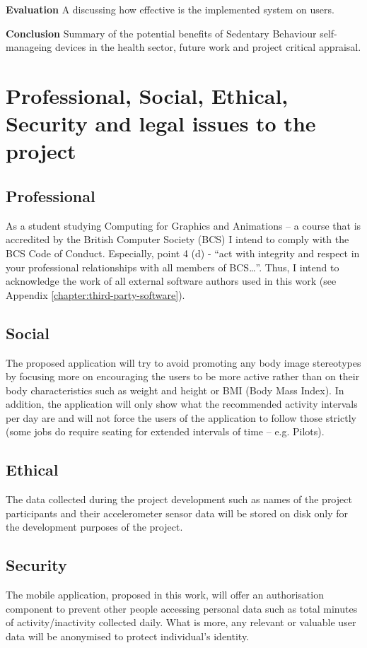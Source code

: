     
    \textbf{Evaluation} A discussing how effective is the implemented system on users.\newline
    
    
    \textbf{Conclusion} Summary of the potential benefits of Sedentary Behaviour self-manageing devices in the health sector, future work and project critical appraisal.\newline
    
    
    \section{Professional, Social, Ethical, Security and legal issues to the project}
    
    \subsection{Professional}
    As a student studying Computing for Graphics and Animations – a course that is accredited by the British Computer Society (BCS) I intend to comply with the BCS Code of Conduct. Especially, point 4 (d) \citep{bcs_2017} - “act with integrity and respect in your professional relationships with all members of BCS…”. Thus, I intend to acknowledge the work of all external software authors used in this work (see Appendix \ref{chapter:third-party-software}).

    \subsection{Social}
    The proposed application will try to avoid promoting any body image stereotypes by focusing more on encouraging the users to be more active rather than on their body characteristics such as weight and height or BMI (Body Mass Index). In addition, the application will only show what the recommended activity intervals per day are and will not force the users of the application to follow those strictly (some jobs do require seating for extended intervals of time – e.g. Pilots).
    
    \subsection{Ethical}
    The data collected during the project development such as names of the project participants and their accelerometer sensor data will be stored on disk only for the development purposes of the project. 
    
    \subsection{Security}
    The mobile application, proposed in this work, will offer an authorisation component to prevent other people accessing personal data such as total minutes of activity/inactivity collected daily. What is more, any relevant or valuable user data will be anonymised to protect individual’s identity.

